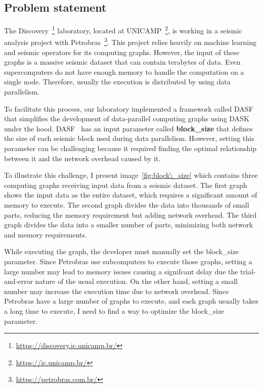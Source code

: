 \subsection{Problem statement}
\label{subsec:problem-statement}

The Discovery~\footnote{\url{https://discovery.ic.unicamp.br/}} laboratory, located at UNICAMP~\footnote{\url{https://ic.unicamp.br/}}, is working in a seismic analysis project with Petrobras~\footnote{\url{https://petrobras.com.br/}}.
This project relies heavily on machine learning and seismic operators for its computing graphs.
However, the input of these graphs is a massive seismic dataset that can contain terabytes of data.
Even supercomputers do not have enough memory to handle the computation on a single node.
Therefore, usually the execution is distributed by using data parallelism.

To facilitate this process, our laboratory implemented a framework called DASF~\cite{dasf} that simplifies the development of data-parallel computing graphs using DASK~\cite{dask} under the hood.
DASF~\cite{dasf} has an input parameter called \textbf{block\_size} that defines the size of each seismic block used during data parallelism.
However, setting this parameter can be challenging because it required finding the optimal relationship between it and the network overhead caused by it.

To illustrate this challenge, I present image~\ref{fig:block\_size} which contains three computing graphs receiving input data from a seismic dataset.
The first graph shows the input data as the entire dataset, which requires a significant amount of memory to execute.
The second graph divides the data into thousands of small parts, reducing the memory requirement but adding network overhead.
The third graph divides the data into a smaller number of parts, minimizing both network and memory requirements.


While executing the graph, the developer must manually set the block\_size parameter.
Since Petrobras use subcomputers to execute those graphs, setting a large number may lead to memory issues causing a signifcant delay due the trial-and-error nature of the usual execution.
On the other hand, setting a small number may increase the execution time due to network overhead.
Since Petrobras have a large number of graphs to execute, and each graph usually takes a long time to execute, I need to find a way to optimize the block\_size parameter.

